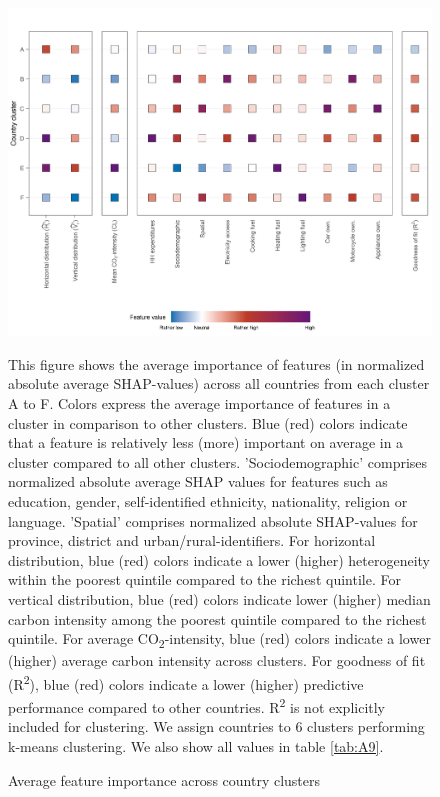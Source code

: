 \documentclass[12pt, a4paper]{article}
\newenvironment{subcaption2}
{\strut
\vspace{-5pt}
\begin{minipage}[b]{0.95\textwidth}
  \hspace*{-\parindent}
  \footnotesize}
 {\end{minipage}}
\begin{document}
\begin{figure}[ht!]
    \centering
    \includegraphics{1_Figures/Figure 3/Figure_3_Corrected.jpg}
    \caption{Average feature importance across country clusters}
    \label{fig:fig_3}
    \begin{subcaption2}
    This figure shows the average importance of features (in normalized absolute average SHAP-values) across all countries from each cluster A to F. Colors express the average importance of features in a cluster in comparison to other clusters. Blue (red) colors indicate that a feature is relatively less (more) important on average in a cluster compared to all other clusters. 'Sociodemographic' comprises normalized absolute average SHAP values for features such as education, gender, self-identified ethnicity, nationality, religion or language. 'Spatial' comprises normalized absolute SHAP-values for province, district and urban/rural-identifiers. For horizontal distribution, blue (red) colors indicate a lower (higher) heterogeneity within the poorest quintile compared to the richest quintile. For vertical distribution, blue (red) colors indicate lower (higher) median carbon intensity among the poorest quintile compared to the richest quintile. For average CO\textsubscript{2}-intensity, blue (red) colors indicate a lower (higher) average carbon intensity across clusters. For goodness of fit (R\textsuperscript{2}), blue (red) colors indicate a lower (higher) predictive performance compared to other countries. R\textsuperscript{2} is not explicitly included for clustering. We assign countries to 6 clusters performing k-means clustering. We also show all values in table \ref{tab:A9}.
    \end{subcaption2}
\end{figure}
\end{document}
